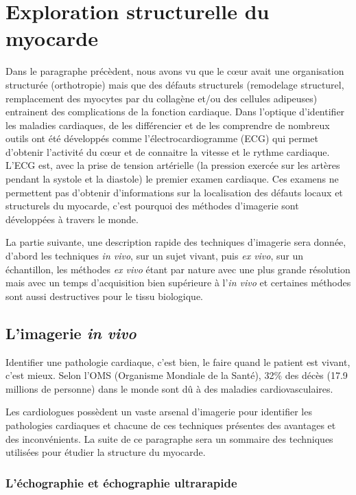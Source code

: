 \section{Exploration structurelle du myocarde }
Dans le paragraphe précèdent, nous avons vu que le cœur avait une organisation structurée (orthotropie) mais que des défauts structurels (remodelage structurel, remplacement des myocytes par du collagène et/ou des cellules adipeuses) entrainent des complications de la fonction cardiaque.
%
Dans l’optique d’identifier les maladies cardiaques, de les différencier et de les comprendre de nombreux outils ont été développés comme l’électrocardiogramme (ECG) qui permet d’obtenir l’activité du cœur et de connaitre la vitesse et le rythme cardiaque. L’ECG est, avec la prise de tension artérielle (la pression exercée sur les artères pendant la systole et la diastole) le premier examen cardiaque. Ces examens ne permettent pas d’obtenir d’informations sur la localisation des défauts locaux et structurels du myocarde, c’est pourquoi des méthodes d’imagerie sont développées à travers le monde.

La partie suivante, une description rapide des techniques d’imagerie sera donnée, d’abord les techniques \textit{in vivo}, sur un sujet vivant, puis \textit{ex vivo}, sur un échantillon, les méthodes \textit{ex vivo} étant par nature avec une plus grande résolution mais avec un temps d’acquisition bien supérieure à l’\textit{in vivo} et certaines méthodes sont aussi destructives pour le tissu biologique.

\subsection{L'imagerie \textit{in vivo}}

Identifier une pathologie cardiaque, c’est bien, le faire quand le patient est vivant, c’est mieux. Selon l’OMS (Organisme Mondiale de la Santé), 32\% des décès (17.9 millions de personne)  dans le monde sont dû à des maladies cardiovasculaires.

Les cardiologues possèdent un vaste arsenal d’imagerie pour identifier les pathologies cardiaques et chacune de ces techniques présentes des avantages et des inconvénients. La suite de ce paragraphe sera un sommaire des techniques utilisées pour étudier la structure du myocarde.



\subsubsection{L’échographie et échographie ultrarapide}

